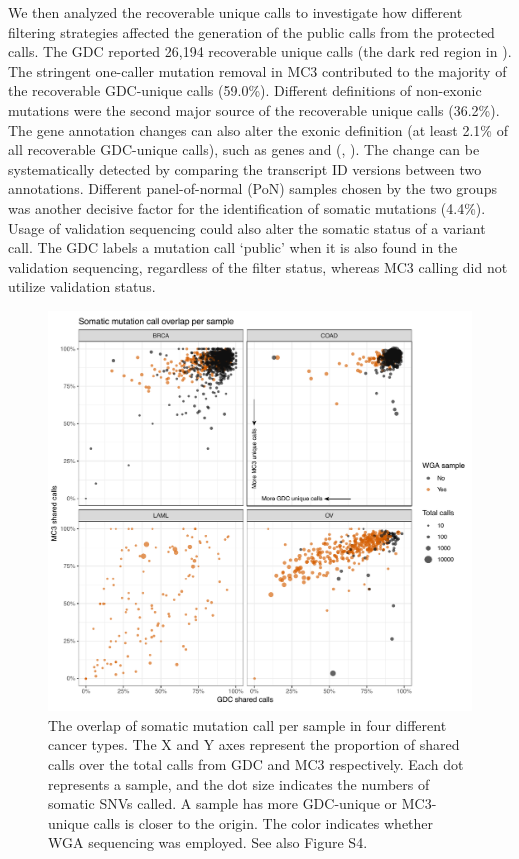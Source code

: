 We then analyzed the recoverable unique calls to investigate how different filtering strategies affected the generation of the public calls from the protected calls. The GDC reported 26,194 recoverable unique calls (the dark red region in ). The stringent one-caller mutation removal in MC3 contributed to the majority of the recoverable GDC-unique calls (59.0\%). Different definitions of non-exonic mutations were the second major source of the recoverable unique calls (36.2\%). The gene annotation changes can also alter the exonic definition (at least 2.1\% of all recoverable GDC-unique calls), such as genes  and  (, ). The change can be systematically detected by comparing the transcript ID versions between two annotations. Different panel-of-normal (PoN) samples chosen by the two groups was another decisive factor for the identification of somatic mutations (4.4\%). Usage of validation sequencing could also alter the somatic status of a variant call. The GDC labels a mutation call `public' when it is also found in the validation sequencing, regardless of the filter status, whereas MC3 calling did not utilize validation status.

\begin{figure}[tb]
    \centering
    \includegraphics[width=0.9\linewidth]{figures/chap02_mutation_pipeline_qc/GDC_MC3_overlap_per_sample.pdf}
    \caption[Overlapping somatic mutation calls between GDC and MC3 per sample.]{The overlap of somatic mutation call per sample in four different cancer types. The X and Y axes represent the proportion of shared calls over the total calls from GDC and MC3 respectively. Each dot represents a sample, and the dot size indicates the numbers of somatic SNVs called. A sample has more GDC-unique or MC3-unique calls is closer to the origin. The color indicates whether WGA sequencing was employed. See also Figure S4.}
    \label{fig:mut-call-qc-overlap}
\end{figure}

